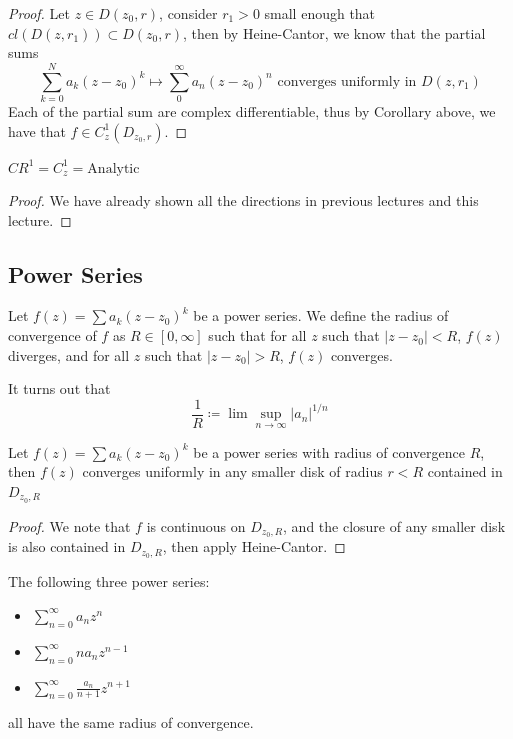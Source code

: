\documentclass{article}
\begin{document}
\begin{proof}
    Let $z \in D(z_0, r)$, consider $r_1 > 0$ small enough that $cl(D(z, r_1)) \subset D(z_0, r)$, then by Heine-Cantor, we know that the partial sums
    \[\sum_{k = 0}^N a_k (z - z_0)^k \mapsto \sum_{0}^\infty a_n (z - z_0)^n \text{ converges uniformly in $D(z, r_1)$}\]
    Each of the partial sum are complex differentiable, thus by Corollary above, we have that $f \in C_z^1(D_{z_0, r})$.
\end{proof}

\begin{theorem}
    $CR^1 = C_z^1 = \text{Analytic}$
\end{theorem}

\begin{proof}
We have already shown all the directions in previous lectures and this lecture.
\end{proof}

\subsection{Power Series}

\begin{definition}
    Let $f(z) = \sum a_k (z - z_0)^k$ be a power series. We define the radius of convergence of $f$ as $R \in [0, \infty]$ such that for all $z$ such that $|z - z_0| < R$, $f(z)$ diverges, and for all $z$ such that $|z - z_0| > R$, $f(z)$ converges.
\end{definition}

\begin{remark}
    It turns out that
    \[\frac{1}{R} \coloneqq \lim \sup_{n \to \infty} |a_n|^{1/n}\]
\end{remark}

\begin{proposition}
    Let $f(z) = \sum a_k (z - z_0)^k$ be a power series with radius of convergence $R$, then $f(z)$ converges uniformly in any smaller disk of radius $r < R$ contained in $D_{z_0, R}$
\end{proposition}

\begin{proof}
    We note that $f$ is continuous on $D_{z_0, R}$, and the closure of any smaller disk is also contained in $D_{z_0, R}$, then apply Heine-Cantor.
\end{proof}

\begin{corollary}
    The following three power series:
    \begin{itemize}
        \item $\sum_{n = 0}^\infty a_n z^n$
        \item $\sum_{n = 0}^\infty n a_n z^{n-1}$
        \item $\sum_{n = 0}^\infty \frac{a_n}{n + 1} z^{n+1}$
    \end{itemize}
    all have the same radius of convergence.
\end{corollary}
\end{document}
